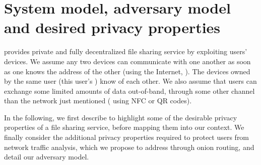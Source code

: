 
\section{System model, adversary model and desired privacy properties}%
\label{system-model}

\name provides private and fully decentralized file sharing service by exploiting 
users' devices. 
We assume any two devices can communicate with one another as soon as one knows the address of the other (\eg using the Internet, ). The devices owned by the same user (this user's \squad) know of each other.
We also assume that users can exchange some limited amounts of data 
out-of-band, \ie through some other channel than the network just mentioned (\eg 
using \ac{NFC} or QR codes).




In the following, we first describe 
to
highlight some of the desirable privacy properties of a file sharing service, before mapping them into our 
context. 
We finally consider the additional privacy properties required to protect users from  network traffic analysis, which we propose to address through onion
routing, and detail our adversary model.  

